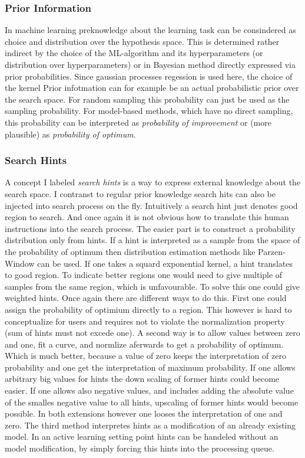 \documentclass[english]{article}
\begin{document}
\subsubsection*{Prior Information}
In machine learning preknowledge about the learning task can be consindered as choice and distribution over the hypothesis space. This is determined rather indirect by the choice of the \ac{ML}-algorithm and its hyperparameters (or distribution over hyperparameters) or in Bayesian method directly expressed via prior probabilities. Since gaussian processes regession is used here, the choice of the kernel
Prior infotmation can for example be an actual probabilistic prior over the search space. For random sampling this probability can just be used as the sampling probability. For model-based methods, which have no direct sampling, this probability can be interpreted as \textit{probability of improvement} or (more plausible) as \textit{probability of optimum}.

\subsubsection*{Search Hints}
A concept I labeled \textit{search hints} is a way to express external knowledge about the search space. I contranst to regular prior knowledge search hits can also be injected into search process on the fly. Intuitively a search hint just denotes good region to search. And once again it is not obvious how to translate this human instructions into the search process.
The easier part is to construct a probability distribution only from hints. If a hint is interpreted as a sample from the space of the probability of optimum then distribution estimation methods like Parzen-Window can be used. If one takes a squard exponential kernel, a hint translates to good region. To indicate better regions one would need to give multiple of samples from the same region, which is unfavourable. To solve this one could give weighted hints. Once again there are different ways to do this.
First one could assign the probability of optimium directly to a region. This however is hard to conceptualize for users and requires not to violate the normalization property (sum of hints must not excede one).
A second way is to allow values between zero and one, fit a curve, and normlize aferwards to get a probability of optimum. Which is much better, because a value of zero keeps the interpretation of zero probability and one get the interpretation of maximum probability. If one allows arbitrary big values for hints the down scaling of former hints could become easier. If one allows also negative values, and includes adding the absolute value of the smalles negative value to all hints, upscaling of former hints would become possible. In both extensions however one looses the interpretation of one and zero.
The third method interpretes hints as a modification of an already existing model.
In an active learning setting point hints can be handeled without an model modification, by simply forcing this hints into the processing queue.
\end{document}
